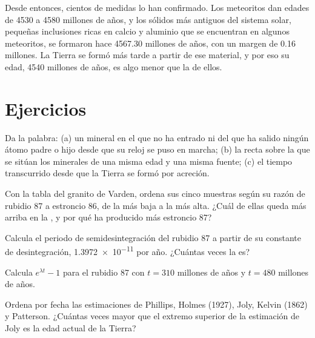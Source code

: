 Desde entonces, cientos de medidas lo han confirmado. Los meteoritos dan
edades de 4530 a 4580 millones de años, y los sólidos más antiguos del
sistema solar, pequeñas inclusiones ricas en calcio y aluminio que se
encuentran en algunos meteoritos, se formaron hace \num{4567.30} millones de
años, con un margen de 0.16 millones. La Tierra se formó más tarde a partir de
ese material, y por eso su edad, 4540 millones de años, es algo menor que la
de ellos.

\section{Ejercicios}

\begin{exercise}[$\star$]\label{exo:g12:age-of-the-earth:1}
Da la palabra: (a) un mineral en el que no ha entrado ni del que ha salido
ningún átomo padre o hijo desde que su reloj se puso en marcha; (b) la recta
sobre la que se sitúan los minerales de una misma edad y una misma fuente;
(c) el tiempo transcurrido desde que la Tierra se formó por acreción.
\end{exercise}

\begin{exercise}[$\star$]\label{exo:g12:age-of-the-earth:2}
Con la tabla del granito de Varden, ordena sus cinco muestras según su razón
de rubidio 87 a estroncio 86, de la más baja a la más alta. ¿Cuál de ellas
queda más arriba en la , y por qué ha producido más estroncio 87?
\end{exercise}

\begin{exercise}[$\star$]\label{exo:g12:age-of-the-earth:3}
Calcula el periodo de semidesintegración del rubidio 87 a partir de su
constante de desintegración, \num{1.3972e-11} por año. ¿Cuántas veces la
 es?
\end{exercise}

\begin{exercise}[$\star$]\label{exo:g12:age-of-the-earth:4}
Calcula $e^{\lambda t} - 1$ para el rubidio 87 con $t = 310$ millones de años
y $t = 480$ millones de años.
\end{exercise}

\begin{exercise}[$\star$]\label{exo:g12:age-of-the-earth:5}
Ordena por fecha las estimaciones de Phillips, Holmes (1927), Joly, Kelvin
(1862) y Patterson. ¿Cuántas veces mayor que el extremo superior de la
estimación de Joly es la edad actual de la Tierra?
\end{exercise}

